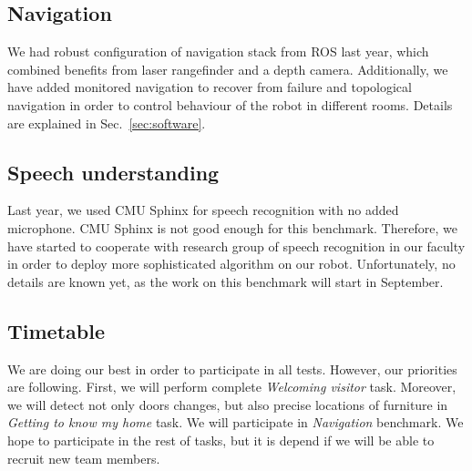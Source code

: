 \subsection{Navigation}

We had robust configuration of navigation stack from ROS last year, which combined benefits from laser rangefinder and a depth camera. 
Additionally, we have added monitored navigation to recover from failure and topological navigation in order to control behaviour of the robot in different rooms. Details are explained in Sec.~\ref{sec:software}.

\subsection{\label{sec:speechrec}Speech understanding}

Last year, we used CMU Sphinx for speech recognition with no added microphone. CMU Sphinx is not good enough for this benchmark. 
Therefore, we have started to cooperate with research group of speech recognition in our faculty in order to deploy more sophisticated algorithm on our robot. 
Unfortunately, no details are known yet, as the work on this benchmark will start in September.

\subsection{Timetable}

We are doing our best in order to participate in all tests. However, our priorities are following.
First, we will perform complete \textit{Welcoming visitor} task. 
Moreover, we will detect not only doors changes, but also precise locations of furniture in \textit{Getting to know my home} task. 
We will participate in \textit{Navigation} benchmark. We hope to participate in the rest of tasks, but it is depend if we will be able to recruit new team members.


